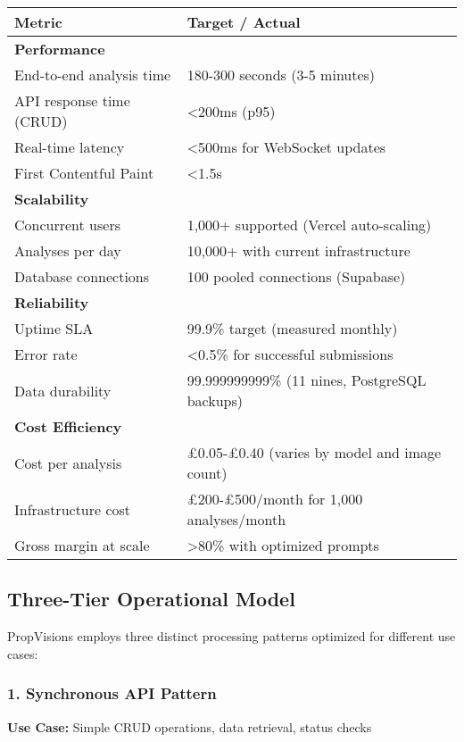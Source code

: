 \documentclass[11pt,a4paper]{article}
\begin{document}
\begin{longtable}{@{}p{4cm}p{10.5cm}@{}}
\toprule
\textbf{Metric} & \textbf{Target / Actual} \\
\midrule
\textbf{Performance} & \\
End-to-end analysis time & 180-300 seconds (3-5 minutes) \\
API response time (CRUD) & \textless 200ms (p95) \\
Real-time latency & \textless 500ms for WebSocket updates \\
First Contentful Paint & \textless 1.5s \\
\addlinespace
\textbf{Scalability} & \\
Concurrent users & 1,000+ supported (Vercel auto-scaling) \\
Analyses per day & 10,000+ with current infrastructure \\
Database connections & 100 pooled connections (Supabase) \\
\addlinespace
\textbf{Reliability} & \\
Uptime SLA & 99.9\% target (measured monthly) \\
Error rate & \textless 0.5\% for successful submissions \\
Data durability & 99.999999999\% (11 nines, PostgreSQL backups) \\
\addlinespace
\textbf{Cost Efficiency} & \\
Cost per analysis & £0.05-£0.40 (varies by model and image count) \\
Infrastructure cost & £200-£500/month for 1,000 analyses/month \\
Gross margin at scale & \textgreater 80\% with optimized prompts \\
\bottomrule
\end{longtable}

\subsection{Three-Tier Operational Model}

PropVisions employs three distinct processing patterns optimized for different use cases:

\subsubsection{1. Synchronous API Pattern}

\textbf{Use Case:} Simple CRUD operations, data retrieval, status checks
\end{document}

